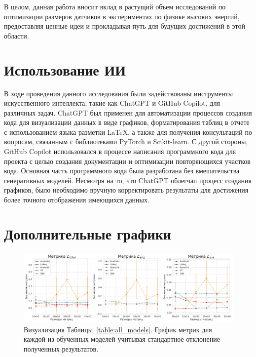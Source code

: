 \documentclass[a4paper,12pt]{extarticle}
\begin{document}
В целом, данная работа вносит вклад в растущий объем исследований по оптимизации размеров датчиков в экспериментах по физике высоких энергий, предоставляя ценные идеи и прокладывая путь для будущих достижений в этой области.

\section{Использование ИИ}

В ходе проведения данного исследования были задействованы инструменты искусственного интеллекта, такие как ChatGPT и GitHub Copilot, для различных задач. ChatGPT был применен для автоматизации процессов создания кода для визуализации данных в виде графиков, форматирования таблиц в отчете с использованием языка разметки LaTeX, а также для получения консультаций по вопросам, связанным с библиотеками PyTorch и Scikit-learn. С другой стороны, GitHub Copilot использовался в процессе написания программного кода для проекта с целью создания документации и оптимизации повторяющихся участков кода. Основная часть программного кода была разработана без вмешательства генеративных моделей. Несмотря на то, что ChatGPT облегчал процесс создания графиков, было необходимо вручную корректировать результаты для достижения более точного отображения имеющихся данных.

\newpage 
\printbibliography[heading=bibintoc] 


\newpage
\appendix

\section{Дополнительные графики}

\begin{figure}[ht]
    \centering
    \includegraphics[width=1.0\textwidth]{graphics/models_comp_extra.png}
    \caption{Визуализация Таблицы~\ref{table:all_models}. График метрик для каждой из обученных моделей учитывая стандартное отклонение полученных результатов.}
    \label{graph:all_models_extra}
\end{figure}
\end{document}
